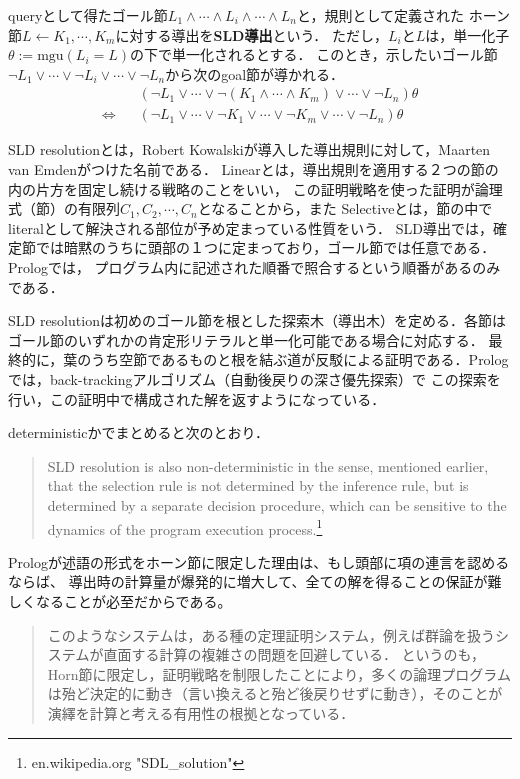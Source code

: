 \documentclass[uplatex, dvipdfmx]{jsreport}
\begin{document}
\begin{definition}\label{def-SLD-solution}
    queryとして得たゴール節$L_1\land\cdots\land L_i\land\cdots\land L_n$と，規則として定義された
    ホーン節$L\leftarrow K_1,\cdots,K_m$に対する導出を\textbf{SLD導出}という．
    ただし，$L_i$と$L$は，単一化子$\theta:=\mathrm{mgu}(L_i=L)$の下で単一化されるとする．
    このとき，示したいゴール節$\lnot L_1\lor\cdots\lor \lnot L_i\lor\cdots\lor \lnot L_n$から次のgoal節が導かれる．
    \begin{align*}
        &(\lnot L_1\lor\cdots\lor \lnot(K_1\land\cdots\land K_m) \lor\cdots\lor \lnot L_n)\theta \\
        \Longleftrightarrow\;\;\;&(\lnot L_1\lor\cdots\lor \lnot K_1\lor\cdots\lor\lnot K_m \lor\cdots\lor \lnot L_n)\theta
    \end{align*}
\end{definition}
\begin{remark}
    SLD resolutionとは，Robert Kowalskiが導入した導出規則に対して，Maarten van Emdenがつけた名前である\cite{SLD-resolution}．
    Linearとは，導出規則を適用する２つの節の内の片方を固定し続ける戦略のことをいい，
    この証明戦略を使った証明が論理式（節）の有限列$C_1,C_2,\cdots,C_n$となることから，また
    Selectiveとは，節の中でliteralとして解決される部位が予め定まっている性質をいう．
    SLD導出では，確定節では暗黙のうちに頭部の１つに定まっており，ゴール節では任意である．Prologでは，
    プログラム内に記述された順番で照合するという順番があるのみである．

    SLD resolutionは初めのゴール節を根とした探索木（導出木）を定める．各節はゴール節のいずれかの肯定形リテラルと単一化可能である場合に対応する．
    最終的に，葉のうち空節であるものと根を結ぶ道が反駁による証明である．Prologでは，back-trackingアルゴリズム（自動後戻りの深さ優先探索）で
    この探索を行い，この証明中で構成された解を返すようになっている．

    deterministicかでまとめると次のとおり．
    \begin{quote}
        SLD resolution is also non-deterministic in the sense, mentioned earlier, that the selection rule is not determined by the inference rule, but is determined by a separate decision procedure, which can be sensitive to the dynamics of the program execution process.\footnote{en.wikipedia.org "SDL\_solution"}
    \end{quote}
    Prologが述語の形式をホーン節に限定した理由は、もし頭部に項の連言を認めるならば、
    導出時の計算量が爆発的に増大して、全ての解を得ることの保証が難しくなることが必至だからである。
    \begin{quote}
        このようなシステムは，ある種の定理証明システム，例えば群論を扱うシステムが直面する計算の複雑さの問題を回避している．
        というのも，Horn節に限定し，証明戦略を制限したことにより，多くの論理プログラムは殆ど決定的に動き（言い換えると殆ど後戻りせずに動き），そのことが演繹を計算と考える有用性の根拠となっている\cite{論理プログラミングの基礎}．
    \end{quote}
\end{remark}
\end{document}
